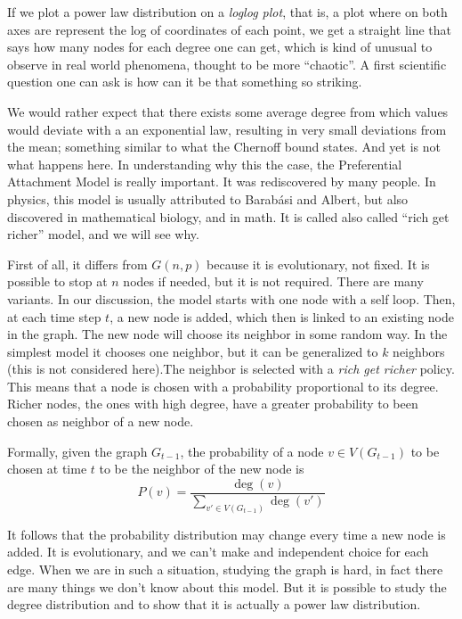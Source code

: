 If we plot a power law distribution on a \emph{loglog plot}, that is, a plot where on both axes are represent the log of coordinates of each point, we get a straight line that says how many nodes for each degree one can get, which is kind of unusual to observe in real world phenomena, thought to be more ``chaotic''. A first scientific question one can ask is how can it be that something so striking.

We would rather expect that there exists some average degree from which values would deviate with a an exponential law, resulting in very small deviations from the mean; something similar to what the Chernoff bound states. And yet is not what happens here. In understanding why this the case, the Preferential Attachment Model is really important. It was rediscovered by many people. In physics, this model is usually attributed to Barabási and Albert, but also discovered in mathematical biology, and in math. It is called also called ``rich get richer'' model, and we will see why.

First of all, it differs from $G(n,p)$ because it is evolutionary, not fixed. It is possible to stop at $n$ nodes if needed, but it is not required. There are many variants. In our discussion, the model starts with one node with a self loop. Then, at each time step $t$, a new node is added, which then is linked to an existing node in the graph. The new node will choose its neighbor in some random way. In the simplest model it chooses one neighbor, but it can be generalized to $k$ neighbors (this is not considered here).The neighbor is selected with a \emph{rich get richer} policy. This means that a node is chosen with a probability proportional to its degree. Richer nodes, the ones with high degree, have a greater probability to been chosen as neighbor of a new node.

Formally, given the graph $G_{t-1}$, the probability of a node $v \in V(G_{t-1})$ to be chosen at time $t$ to be the neighbor of the new node is
\begin{equation}
P(v) = \frac{\deg(v)}{\sum_{v' \in V(G_{t-1})} \deg(v')}
\end{equation}

It follows that the probability distribution may change every time a new node is added. It is evolutionary, and we can't make and independent choice for each edge. When we are in such a situation, studying the graph is hard, in fact there are many things we don't know about this model. But it is possible to study the degree distribution and to show  that it is actually a power law distribution.

